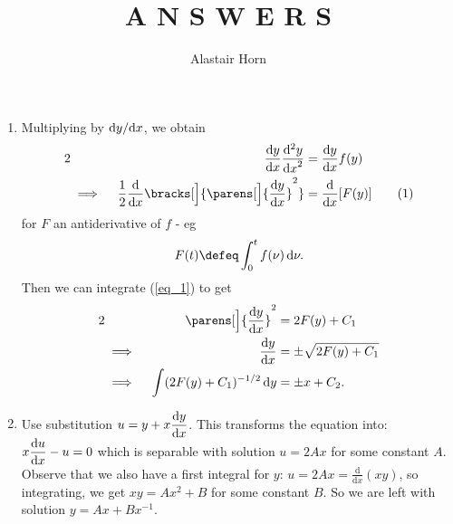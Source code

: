 \documentclass[a4paper,12pt,fleqn]{article}
\author{Alastair Horn}
\title{A N S W E R S}
\begin{document}
\maketitle

\begin{enumerate}
 \item

  Multiplying by \(\fdv<y>{x}\), we obtain
  \begin{alignat*}2
   && \dv<y>{x} \dv[2]<y>{x} &{}= \dv<y>{x}f(y) \\
   &\implies{}& \frac 12 \dv{x} \bracks[\Big]{\parens[\Big]{\dv<y>{x}}^2}
    &{}= \dv{x} [F(y)] \tag{1} \label{eq_1}
  \end{alignat*}
  for \(F\) an antiderivative of \(f\) - eg
  \begin{equation*}
   F(t) \defeq \integ[0]<t>{f(\nu)}{\nu}.
  \end{equation*}
  Then we can integrate (\ref{eq_1}) to get
  \begin{alignat*}2
   && \parens[\Big]{\dv<y>{x}}^2 &{}= 2F(y) + C_1 \\
   &\implies{}& \dv<y>{x} &{}= \pm \sqrt{2F(y) + C_1} \\
   &\implies{}& \integ{(2F(y) + C_1)^{-1/2}}{y} &{}= \pm x + C_2.
  \end{alignat*}

 \item

  Use substitution \(\displaystyle u = y + x\dv<y>{x}\). This transforms the
  equation into: \(\displaystyle x\dv<u>{x} - u = 0\) which is separable with solution
  \(u = 2Ax\) for some constant \(A\). Observe that we also have a first integral
  for \(y\): \(\displaystyle u = 2Ax = \frac{\mathrm{d}}{\mathrm{d}x}(xy)\),
  so integrating, we get \(xy = Ax^2 + B\) for some constant \(B\).
  So we are left with solution \(y = Ax + Bx^{-1}\).


\end{enumerate}
\end{document}
